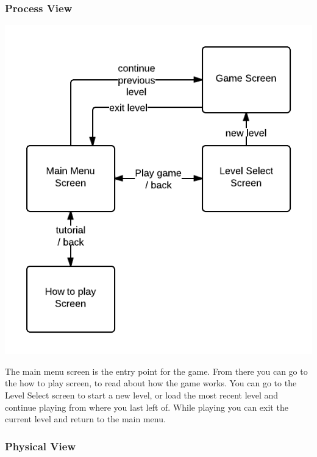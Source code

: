 \subsubsection{Process View} %
\includegraphics[width=\textwidth]{pictures/process_view_screen_flow}

The main menu screen is the entry point for the game. From there you can go to the how to play screen, 
to read about how the game works. You can go to the Level Select screen to start a new level, or load the 
most recent level and continue playing from where you last left of. While playing you can exit the current 
level and return to the main menu.

\subsubsection{Physical View} %

